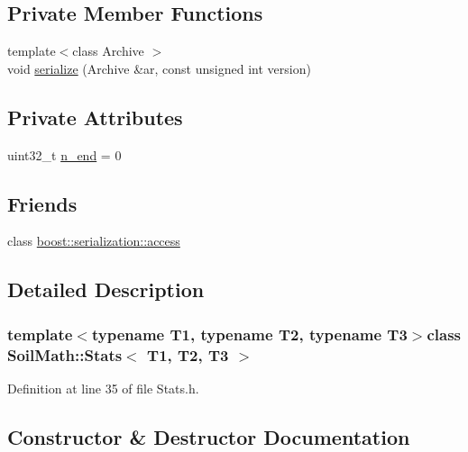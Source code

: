 \subsection*{Private Member Functions}
\begin{DoxyCompactItemize}
\item 
{\footnotesize template$<$class Archive $>$ }\\void \hyperlink{class_soil_math_1_1_stats_a708500880cf0fccd205fb59787f8899f}{serialize} (Archive \&ar, const unsigned int version)
\end{DoxyCompactItemize}
\subsection*{Private Attributes}
\begin{DoxyCompactItemize}
\item 
uint32\+\_\+t \hyperlink{class_soil_math_1_1_stats_a58553c8379f35dbc40f46ad228b5457e}{n\+\_\+end} = 0
\end{DoxyCompactItemize}
\subsection*{Friends}
\begin{DoxyCompactItemize}
\item 
class \hyperlink{class_soil_math_1_1_stats_ac98d07dd8f7b70e16ccb9a01abf56b9c}{boost\+::serialization\+::access}
\end{DoxyCompactItemize}


\subsection{Detailed Description}
\subsubsection*{template$<$typename T1, typename T2, typename T3$>$class Soil\+Math\+::\+Stats$<$ T1, T2, T3 $>$}



Definition at line 35 of file Stats.\+h.



\subsection{Constructor \& Destructor Documentation}
\hypertarget{class_soil_math_1_1_stats_aa9727b7ea39b46f8a010a7b710b26d83}{}

